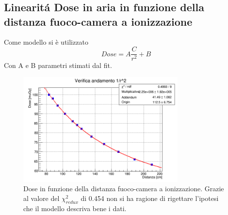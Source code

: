 \documentclass[a4paper]{article}
\begin{document}
\subsection{Linearit\'a Dose in aria in funzione della distanza fuoco-camera a ionizzazione}
Come modello si è utilizzato \begin{equation}
Dose=A\frac{C}{r^{2}}+B
\end{equation}
Con A e B parametri stimati dal fit.
\begin{figure}[H]
\centering
\includegraphics[width=0.75\textwidth]{Dosevsdistancewithpar.png}
\caption{Dose in funzione della distanza fuoco-camera a ionizzazione. Grazie al valore del $\chi^{2}_{redux}$ di 0.454 non si ha ragione di rigettare l'ipotesi che il modello descriva bene i dati.}
\end{figure}


\newpage

\end{document}

